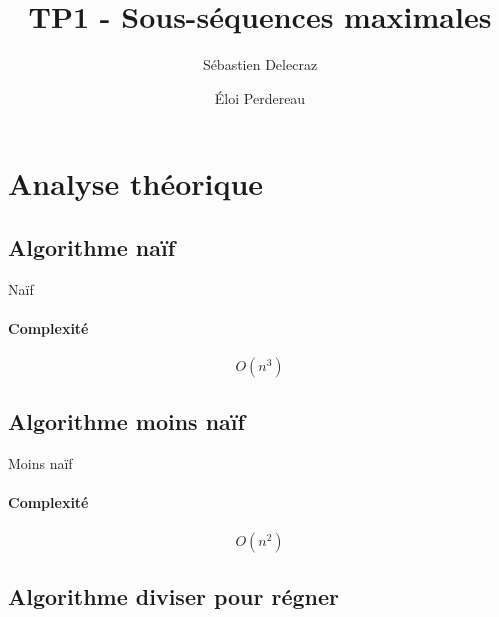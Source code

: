 \documentclass[11pt]{article} %
\title{TP1 - Sous-séquences maximales}
\author{Sébastien Delecraz \and \'Eloi Perdereau}
\begin{document}
\maketitle

\section{Analyse théorique}

\subsection{Algorithme naïf}

\begin{algorithm}
\caption{Naïf}
\end{algorithm}
\paragraph{Complexité}
\[O(n^3)\]

\subsection{Algorithme moins naïf}

\begin{algorithm}
\caption{Moins naïf}
\end{algorithm}
\paragraph{Complexité}
\[O(n^2)\]

\subsection{Algorithme diviser pour régner}
\end{document}

